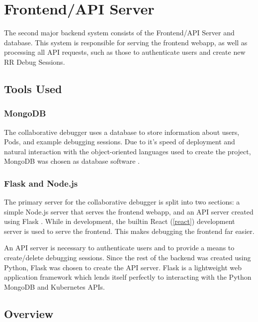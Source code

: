\documentclass[12pt]{article}
\begin{document}
\section{Frontend/API Server}\label{api}

The second major backend system consists of the Frontend/API Server
and database.  This system is responsible for serving the frontend
webapp, as well as processing all API requests, such as those to
authenticate users and create new RR Debug Sessions.

\subsection{Tools Used}

\subsubsection{MongoDB}\label{mongodb}

The collaborative debugger uses a database to store information about
users, Pods, and example debugging sessions.  Due to it's speed of
deployment and natural interaction with the object-oriented languages
used to create the project, MongoDB was chosen as database software
\cite{mongodb}.

\subsubsection{Flask and Node.js}\label{flask/node}

The primary server for the collaborative debugger is split into two
sections: a simple Node.js \cite{node} server that serves the frontend
webapp, and an API server created using Flask \cite{flask}.  While in
development, the builtin React (\ref{react}) development server
is used to serve the frontend.  This makes debugging the frontend far
easier.
\par

An API server is necessary to authenticate users and to provide a
means to create/delete debugging sessions.  Since the rest of the
backend was created using Python, Flask was chosen to create the API
server.  Flask is a lightweight web application framework which lends
itself perfectly to interacting with the Python MongoDB and Kubernetes
APIs.

\subsection{Overview}
\end{document}
